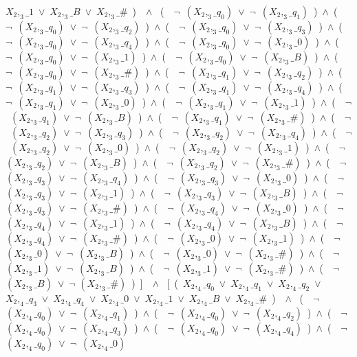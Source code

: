 ﻿\documentclass[a4paper,10pt]{article}
\begin{document}
$X_2,_3\_1$\ $\vee$\ $X_2,_3\_B$\ $\vee$\ $X_2,_3\_\#$\ )\ \ $\wedge$ \ (\ \ $\neg$\ $(X_2,_3\_q_0)$\ $\vee$\ $\neg$\ $(X_2,_3\_q_1)$\ )\ $\wedge$\ (\ \ $\neg$\ $(X_2,_3\_q_0)$\ $\vee$\ $\neg$\ $(X_2,_3\_q_2)$\ )\ $\wedge$\ (\ \ $\neg$\ $(X_2,_3\_q_0)$\ $\vee$\ $\neg$\ $(X_2,_3\_q_3)$\ )\ $\wedge$\ (\ \ $\neg$\ $(X_2,_3\_q_0)$\ $\vee$\ $\neg$\ $(X_2,_3\_q_4)$\ )\ $\wedge$\ (\ \ $\neg$\ $(X_2,_3\_q_0)$\ $\vee$\ $\neg$\ $(X_2,_3\_0)$\ )\ $\wedge$\ (\ \ $\neg$\ $(X_2,_3\_q_0)$\ $\vee$\ $\neg$\ $(X_2,_3\_1)$\ )\ $\wedge$\ (\ \ $\neg$\ $(X_2,_3\_q_0)$\ $\vee$\ $\neg$\ $(X_2,_3\_B)$\ )\ $\wedge$\ (\ \ $\neg$\ $(X_2,_3\_q_0)$\ $\vee$\ $\neg$\ $(X_2,_3\_\#)$\ )\ $\wedge$\ (\ \ $\neg$\ $(X_2,_3\_q_1)$\ $\vee$\ $\neg$\ $(X_2,_3\_q_2)$\ )\ $\wedge$\ (\ \ $\neg$\ $(X_2,_3\_q_1)$\ $\vee$\ $\neg$\ $(X_2,_3\_q_3)$\ )\ $\wedge$\ (\ \ $\neg$\ $(X_2,_3\_q_1)$\ $\vee$\ $\neg$\ $(X_2,_3\_q_4)$\ )\ $\wedge$\ (\ \ $\neg$\ $(X_2,_3\_q_1)$\ $\vee$\ $\neg$\ $(X_2,_3\_0)$\ )\ $\wedge$\ (\ \ $\neg$\ $(X_2,_3\_q_1)$\ $\vee$\ $\neg$\ $(X_2,_3\_1)$\ )\ $\wedge$\ (\ \ $\neg$\ $(X_2,_3\_q_1)$\ $\vee$\ $\neg$\ $(X_2,_3\_B)$\ )\ $\wedge$\ (\ \ $\neg$\ $(X_2,_3\_q_1)$\ $\vee$\ $\neg$\ $(X_2,_3\_\#)$\ )\ $\wedge$\ (\ \ $\neg$\ $(X_2,_3\_q_2)$\ $\vee$\ $\neg$\ $(X_2,_3\_q_3)$\ )\ $\wedge$\ (\ \ $\neg$\ $(X_2,_3\_q_2)$\ $\vee$\ $\neg$\ $(X_2,_3\_q_4)$\ )\ $\wedge$\ (\ \ $\neg$\ $(X_2,_3\_q_2)$\ $\vee$\ $\neg$\ $(X_2,_3\_0)$\ )\ $\wedge$\ (\ \ $\neg$\ $(X_2,_3\_q_2)$\ $\vee$\ $\neg$\ $(X_2,_3\_1)$\ )\ $\wedge$\ (\ \ $\neg$\ $(X_2,_3\_q_2)$\ $\vee$\ $\neg$\ $(X_2,_3\_B)$\ )\ $\wedge$\ (\ \ $\neg$\ $(X_2,_3\_q_2)$\ $\vee$\ $\neg$\ $(X_2,_3\_\#)$\ )\ $\wedge$\ (\ \ $\neg$\ $(X_2,_3\_q_3)$\ $\vee$\ $\neg$\ $(X_2,_3\_q_4)$\ )\ $\wedge$\ (\ \ $\neg$\ $(X_2,_3\_q_3)$\ $\vee$\ $\neg$\ $(X_2,_3\_0)$\ )\ $\wedge$\ (\ \ $\neg$\ $(X_2,_3\_q_3)$\ $\vee$\ $\neg$\ $(X_2,_3\_1)$\ )\ $\wedge$\ (\ \ $\neg$\ $(X_2,_3\_q_3)$\ $\vee$\ $\neg$\ $(X_2,_3\_B)$\ )\ $\wedge$\ (\ \ $\neg$\ $(X_2,_3\_q_3)$\ $\vee$\ $\neg$\ $(X_2,_3\_\#)$\ )\ $\wedge$\ (\ \ $\neg$\ $(X_2,_3\_q_4)$\ $\vee$\ $\neg$\ $(X_2,_3\_0)$\ )\ $\wedge$\ (\ \ $\neg$\ $(X_2,_3\_q_4)$\ $\vee$\ $\neg$\ $(X_2,_3\_1)$\ )\ $\wedge$\ (\ \ $\neg$\ $(X_2,_3\_q_4)$\ $\vee$\ $\neg$\ $(X_2,_3\_B)$\ )\ $\wedge$\ (\ \ $\neg$\ $(X_2,_3\_q_4)$\ $\vee$\ $\neg$\ $(X_2,_3\_\#)$\ )\ $\wedge$\ (\ \ $\neg$\ $(X_2,_3\_0)$\ $\vee$\ $\neg$\ $(X_2,_3\_1)$\ )\ $\wedge$\ (\ \ $\neg$\ $(X_2,_3\_0)$\ $\vee$\ $\neg$\ $(X_2,_3\_B)$\ )\ $\wedge$\ (\ \ $\neg$\ $(X_2,_3\_0)$\ $\vee$\ $\neg$\ $(X_2,_3\_\#)$\ )\ $\wedge$\ (\ \ $\neg$\ $(X_2,_3\_1)$\ $\vee$\ $\neg$\ $(X_2,_3\_B)$\ )\ $\wedge$\ (\ \ $\neg$\ $(X_2,_3\_1)$\ $\vee$\ $\neg$\ $(X_2,_3\_\#)$\ )\ $\wedge$\ (\ \ $\neg$ $(X_2,_3\_B)$\ $\vee$\ $\neg$ $(X_2,_3\_\#)$\ )\ ]\ \ $\wedge$ \ [\ (\ $X_2,_4\_q_0$\ $\vee$\ $X_2,_4\_q_1$\ $\vee$\ $X_2,_4\_q_2$\ $\vee$\ $X_2,_4\_q_3$\ $\vee$\ $X_2,_4\_q_4$\ $\vee$\ $X_2,_4\_0$\ $\vee$\ $X_2,_4\_1$\ $\vee$\ $X_2,_4\_B$\ $\vee$\ $X_2,_4\_\#$\ )\ \ $\wedge$ \ (\ \ $\neg$\ $(X_2,_4\_q_0)$\ $\vee$\ $\neg$\ $(X_2,_4\_q_1)$\ )\ $\wedge$\ (\ \ $\neg$\ $(X_2,_4\_q_0)$\ $\vee$\ $\neg$\ $(X_2,_4\_q_2)$\ )\ $\wedge$\ (\ \ $\neg$\ $(X_2,_4\_q_0)$\ $\vee$\ $\neg$\ $(X_2,_4\_q_3)$\ )\ $\wedge$\ (\ \ $\neg$\ $(X_2,_4\_q_0)$\ $\vee$\ $\neg$\ $(X_2,_4\_q_4)$\ )\ $\wedge$\ (\ \ $\neg$\ $(X_2,_4\_q_0)$\ $\vee$\ $\neg$\ $(X_2,_4\_0)$\ 
\end{document}
